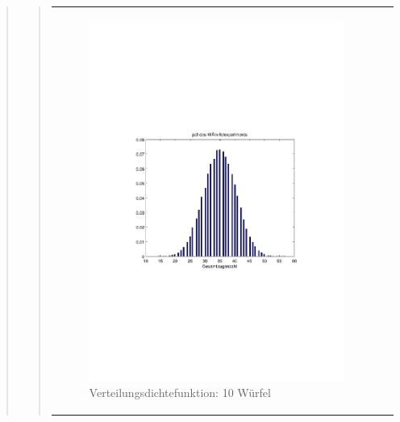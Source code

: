 \begin{quote}
\begin{quote}
\begin{center}
\begin{tabular}{ll}
        \hspace{-5cm}
            \begin{minipage}{0.6\textwidth}
                
                \begin{figure}[H]
                    \label{fig:funktion0alpha}
                    \includegraphics[scale=0.7, trim = 20mm 80mm 20mm 90mm, clip]{Bilder/A1_3_10}
                    \caption{Verteilungsdichtefunktion: 10 Würfel}
                \end{figure}
        
            \end{minipage}
        

\end{tabular}
\end{center}
\end{quote}
\end{quote}
